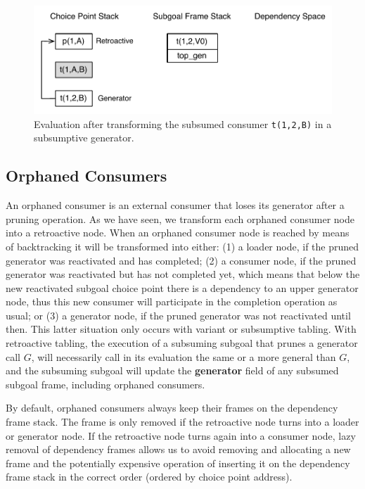 \begin{figure}[ht]
  \centering
    \includegraphics[scale=0.5]{retro_sub4.pdf}
  \caption{Evaluation after transforming the subsumed consumer \texttt{t(1,2,B)} in a subsumptive generator.}
  \label{fig:retro_sub4}
\end{figure}

\subsection{Orphaned Consumers}

An orphaned consumer is an external consumer that loses its generator after a pruning operation.
As we have seen, we transform each orphaned consumer node into a retroactive node.
When an orphaned consumer node is reached by means of backtracking it will be transformed into either:
(1) a loader node, if the pruned generator was reactivated and has completed; (2) a consumer node,
if the pruned generator was reactivated but has not completed yet, which means that below the new
reactivated subgoal choice point there is a dependency to an upper generator node, thus this new
consumer will participate in the completion operation as usual; or (3) a generator node,
if the pruned generator was not reactivated until then. This latter situation only occurs with
variant or subsumptive tabling. With retroactive tabling, the execution of a subsuming subgoal
that prunes a generator call $G$, will necessarily call in its evaluation the same or a more general
than $G$, and the subsuming subgoal will update the \textbf{generator} field
of any subsumed subgoal frame, including orphaned consumers.

By default, orphaned consumers always keep their frames on the dependency frame stack. The frame is only
removed if the retroactive node turns into a loader or generator node. If the retroactive node turns again
into a consumer node, lazy removal of dependency frames allows us to avoid removing and allocating a new
frame and the potentially expensive operation of inserting it on the dependency frame stack in the
correct order (ordered by choice point address).

